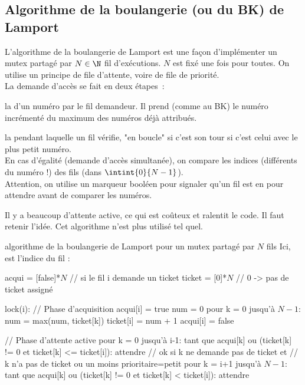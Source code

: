 \begin{adjustwidth}{-3cm}{-3cm}
\subsection{Algorithme de la boulangerie (ou du BK) de Lamport}

L'algorithme de la boulangerie de Lamport est une façon d'implémenter un mutex partagé par $N\in \N$ fil d'exécutions. $N$ est fixé une fois pour toutes.
On utilise un principe de file d'attente, voire de file de priorité.\\
La demande d'accès se fait en deux étapes~:
\begin{enumeratebf}
    \item la  d'un numéro par le fil demandeur. Il prend (comme au BK) le numéro incrémenté du maximum des numéros déjà attribués.
    \item la  pendant laquelle un fil vérifie, "en boucle" si c'est son tour \ie si c'est celui avec le plus petit numéro.\\
    En cas d'égalité (demande d'accès simultanée), on compare les indices (différents du numéro !) des fils (dans $\intint{0}{N-1}$).\\
    Attention, on utilise un marqueur booléen pour signaler qu'un fil est en  pour attendre avant de comparer les numéros.
\end{enumeratebf}

\begin{remarque}{}{}
    Il y a beaucoup d'attente active, ce qui est coûteux et ralentit le code. Il faut retenir l'idée. Cet algorithme n'est plus utilisé tel quel.
\end{remarque}

\begin{implementation}{algorithme de la boulangerie de Lamport pour un mutex partagé par $N$ fils}
    Ici,  est l'indice du fil : 
    \begin{lstLNat}
    acqui = [false]*$N$ // si le fil i demande un ticket
    ticket = [0]*$N$ // 0 -> pas de ticket assigné

    lock(i):
        // Phase d'acquisition
        acqui[i] = true
        num = 0
        pour k = 0 jusqu'à $N-1$:
            num = max(num, ticket[k])
        ticket[i] = num + 1
        acqui[i] = false

        // Phase d'attente active
        pour k = 0 jusqu'à i-1:
            tant que acqui[k] ou (ticket[k] != 0 et ticket[k] <= ticket[i]):
                attendre
            // ok si k ne demande pas de ticket et 
            // k n'a pas de ticket ou un moins prioritaire=petit
        pour k = i+1 jusqu'à $N-1$:
            tant que acqui[k] ou (ticket[k] != 0 et ticket[k] < ticket[i]):
                attendre
    

\end{lstLNat}
\end{implementation}
\end{adjustwidth}
